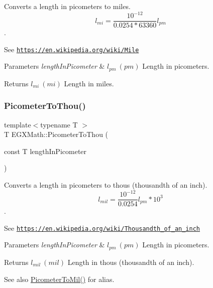Converts a length in picometers to miles. \[ l_{mi}=\frac{10^{-12}}{0.0254 * 63360} l_{pm} \]. 

See \href{https://en.wikipedia.org/wiki/Mile}{\tt https\+://en.\+wikipedia.\+org/wiki/\+Mile} 
\begin{DoxyParams}{Parameters}
{\em length\+In\+Picometer} & $ l_{pm}\ (pm)$ Length in picometers. \\
\hline
\end{DoxyParams}
\begin{DoxyReturn}{Returns}
$ l_{mi}\ (mi)$ Length in miles. 
\end{DoxyReturn}
\mbox{\label{group___e_g_x_math-_conversions-_length_conversions-_picometer-_imperial_gabf48007bf90e25f6d23f847101fd35f1}} 
\subsubsection{\texorpdfstring{Picometer\+To\+Thou()}{PicometerToThou()}}
{\footnotesize\ttfamily template$<$typename T $>$ \\
T E\+G\+X\+Math\+::\+Picometer\+To\+Thou (\begin{DoxyParamCaption}\item[{const T}]{length\+In\+Picometer }\end{DoxyParamCaption})}



Converts a length in picometers to thous (thousandth of an inch). \[ l_{mil}= \frac{10^{-12}}{0.0254} l_{pm} * 10^{3} \]. 

See \href{https://en.wikipedia.org/wiki/Thousandth_of_an_inch}{\tt https\+://en.\+wikipedia.\+org/wiki/\+Thousandth\+\_\+of\+\_\+an\+\_\+inch} 
\begin{DoxyParams}{Parameters}
{\em length\+In\+Picometer} & $ l_{pm}\ (pm)$ Length in picometers. \\
\hline
\end{DoxyParams}
\begin{DoxyReturn}{Returns}
$ l_{mil}\ (mil)$ Length in thous (thousandth of an inch). 
\end{DoxyReturn}
\begin{DoxySeeAlso}{See also}
\mbox{\hyperlink{group___e_g_x_math-_conversions-_length_conversions-_picometer-_imperial_ga727778c82b4049ff45091f492993150d}{Picometer\+To\+Mil()}} for alias. 
\end{DoxySeeAlso}
\mbox{\label{group___e_g_x_math-_conversions-_length_conversions-_picometer-_imperial_ga18b17a118ffb1092beefc221f44a97a2}} 
